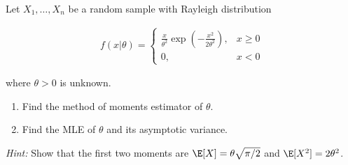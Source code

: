 
\begin{exercise}

Let $X_1,\dots,X_n$ be a random sample with Rayleigh distribution

\begin{align*}
  f(x|\theta) = \begin{cases}
    \frac{x}{\theta^2}\exp\left(-\frac{x^2}{2\theta^2}\right), & x \geq 0 \\
    0, & x < 0
  \end{cases}
\end{align*}

where $\theta > 0$ is unknown.

\begin{enumerate}[label = (\alph*)]
  \item Find the method of moments estimator of $\theta$.
  \item Find the MLE of $\theta$ and its asymptotic variance.
\end{enumerate}

\textit{Hint:} Show that the first two moments are $\E[X] = \theta\sqrt{\pi/2}$
and $\E[X^2] = 2\theta^2$.
\end{exercise}


